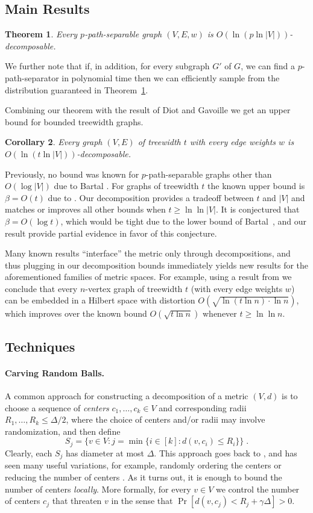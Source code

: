 \documentclass[11pt,fleqn]{article}
\newtheorem{theorem}{Theorem}[section]
\newtheorem{corollary}[theorem]{Corollary}
\begin{document}
\subsection{Main Results}
\begin{theorem} \label{th:sepToDec}
Every $p$-path-separable graph $(V,E,w)$ is $O(\ln(p \ln |V|))$-decomposable.
\end{theorem}
We further note that if, in addition, for every subgraph $G'$ of $G$, we can find a $p$-path-separator in polynomial time then we can efficiently sample from the distribution guaranteed in Theorem~\ref{th:sepToDec}.

Combining our theorem with the result of Diot and Gavoille \cite{DG10} we get an upper bound for bounded treewidth graphs.
\begin{corollary}\label{cor:twToDec}
Every graph $(V,E)$ of treewidth $t$ with every edge weights $w$ is $O(\ln(t \ln |V|))$-decomposable.
\end{corollary}

Previously, no bound was known for $p$-path-separable graphs other than $O(\log |V|)$ due to Bartal \cite{Bartal96}.
For graphs of treewidth $t$ the known upper bound is $\beta = O(t)$ due to \cite{AGGNT14}. 
Our decomposition provides a tradeoff between $t$ and $|V|$ 
and matches or improves all other bounds when $t \ge \ln\ln|V|$. 
It is conjectured that $\beta = O(\log t)$, 
which would be tight due to the lower bound of Bartal~\cite{Bartal96},
and our result provide partial evidence in favor of this conjecture.

Many known results ``interface'' the metric only through decompositions, 
and thus plugging in our decomposition bounds immediately yields new results for the aforementioned families of metric spaces.
For example, using a result from \cite{KLMN05} we conclude that 
every $n$-vertex graph of treewidth $t$ (with every edge weights $w$) 
can be embedded in a Hilbert space with distortion $O(\sqrt{\ln(t \ln n) \cdot \ln n})$, which improves over the known bound $O(\sqrt{t \ln n})$ whenever $t \ge \ln \ln n$.

\subsection{Techniques}
\paragraph{Carving Random Balls.} A common approach for constructing a decomposition of a metric $(V,d)$ is to choose a sequence of {\em centers} $c_1,\ldots,c_k \in V$ and corresponding radii $R_1,\ldots,R_k \le \Delta/2$, where the choice of centers and/or radii may involve randomization, and then define
$$S_j = \{v \in V : j = \min\{i \in [k] : d(v,c_i) \le R_i \}\} \;.$$
Clearly, each $S_j$ has diameter at most $\Delta$.
This approach goes back to \cite{Bartal96}, and has seen many useful variations, for example, randomly ordering the centers \cite{CKR04} or reducing the number of centers \cite{CKR04,GKL03}.
As it turns out, it is enough to bound the number of centers {\em locally}. More formally, for every $v \in V$ we  control the number of centers $c_j$ that threaten $v$ in the sense that $\Pr[d(v,c_j) < R_j + \gamma \Delta] > 0$.
\end{document}
